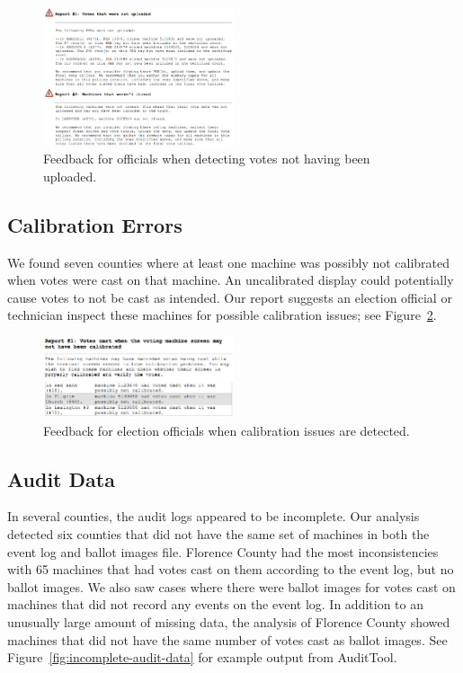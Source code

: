 \documentclass[letterpaper,twocolumn,10pt]{article}
\begin{document}
\begin{figure}[htbp]
\begin{center}
    \includegraphics[width=0.5\textwidth,height=0.3\textheight]{VotesNotUploaded.eps}
\end{center}
\caption{Feedback for officials when detecting votes not having been uploaded.}
\label{fig:greenville-logs}
\end{figure}

\subsection{Calibration Errors}
 We found seven counties where at least one machine was possibly not calibrated
when votes were cast on that machine. An uncalibrated display could potentially
cause votes to not be cast as intended. Our report suggests an election official
or technician inspect these machines for possible calibration issues; see
Figure~\ref{fig:calibration-issues}.


\begin{figure}[htbp]
\begin{center}
    \includegraphics[width=0.5\textwidth,height=0.2\textheight]{NotCalibrated.eps}
\end{center}
\caption{Feedback for election officials when calibration issues are detected.}
\label{fig:calibration-issues}
\end{figure}

\subsection{Audit Data}
 In several counties, the audit logs appeared to be incomplete. Our analysis
 detected six counties that did not have the same set of machines in both the
 event log and ballot images file. Florence County had the most inconsistencies
 with 65 machines that had votes cast on them according to the event log, but no
 ballot images. We also saw cases where there were ballot images for votes cast
 on machines that did not record any events on the event log. In addition to an
 unusually large amount of missing data, the analysis of Florence County showed
 machines that did not have the same number of votes cast as ballot images. See
 Figure~\ref{fig:incomplete-audit-data} for example output from AuditTool. 
\end{document}
